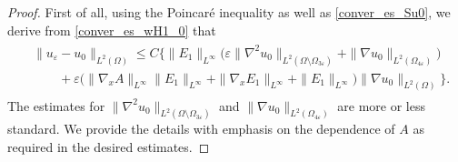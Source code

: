 \documentclass[reqno,12pt]{amsart} %
\theoremstyle{definition}
\theoremstyle{remark}
\numberwithin{equation}{section}
\begin{document}
\begin{proof}
    First of all, using the Poincar\'{e} inequality as well as \eqref{conver_es_Su0}, we derive from \eqref{conver_es_wH1_0} that
    \begin{align}\label{conver_es_n=1_suboptimal}
    \begin{split}
        &\|u_\varepsilon-u_0\|_{L^2(\Omega)}\leq C\Big\{ \|E_1\|_{L^\infty}\big(\varepsilon\|\nabla^2 u_0\|_{L^2(\Omega\setminus \Omega_{3\varepsilon})}+\|\nabla u_0\|_{L^2(\Omega_{4\varepsilon})}\big) \\
        &\qquad + \varepsilon\big(\|\nabla_xA\|_{L^\infty}\|E_1\|_{L^\infty} + \|\nabla_x E_1\|_{L^\infty}+\|E_1\|_{L^\infty}\big)\|\nabla u_0\|_{L^2(\Omega)} \Big\}.
    \end{split}
    \end{align}
    The estimates for $\|\nabla^2 u_0\|_{L^2(\Omega\setminus \Omega_{3\varepsilon})}$ and $\|\nabla u_0\|_{L^2(\Omega_{4\varepsilon})}$ are more or less standard. We provide the details with emphasis on the dependence of $A$ as required in the desired estimates.
    

\end{proof}
\end{document}
